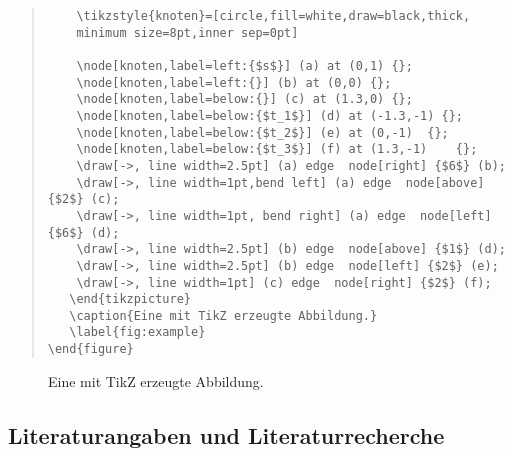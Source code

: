 \documentclass[12pt,a4paper]{article}
\begin{document}
\begin{itemize}
\begin{quote}
\begin{verbatim}
    \tikzstyle{knoten}=[circle,fill=white,draw=black,thick,
    minimum size=8pt,inner sep=0pt]
    
    \node[knoten,label=left:{$s$}] (a) at (0,1) {};
    \node[knoten,label=left:{}] (b) at (0,0) {};
    \node[knoten,label=below:{}] (c) at (1.3,0) {};
    \node[knoten,label=below:{$t_1$}] (d) at (-1.3,-1) {};
    \node[knoten,label=below:{$t_2$}] (e) at (0,-1)	 {};
    \node[knoten,label=below:{$t_3$}] (f) at (1.3,-1)	 {};	
    \draw[->, line width=2.5pt] (a) edge  node[right] {$6$} (b);
    \draw[->, line width=1pt,bend left] (a) edge  node[above] {$2$} (c);
    \draw[->, line width=1pt, bend right] (a) edge  node[left] {$6$} (d);
    \draw[->, line width=2.5pt] (b) edge  node[above] {$1$} (d);
    \draw[->, line width=2.5pt] (b) edge  node[left] {$2$} (e);
    \draw[->, line width=1pt] (c) edge  node[right] {$2$} (f);
   \end{tikzpicture}
   \caption{Eine mit TikZ erzeugte Abbildung.}
   \label{fig:example}
\end{figure}
\end{verbatim}
  \end{quote}
\end{itemize}
\begin{figure}[t]
  \centering
    
    \caption{Eine mit TikZ erzeugte Abbildung.}
    \label{fig:example}
  \end{figure}

\subsection{Literaturangaben und Literaturrecherche}
\end{document}
